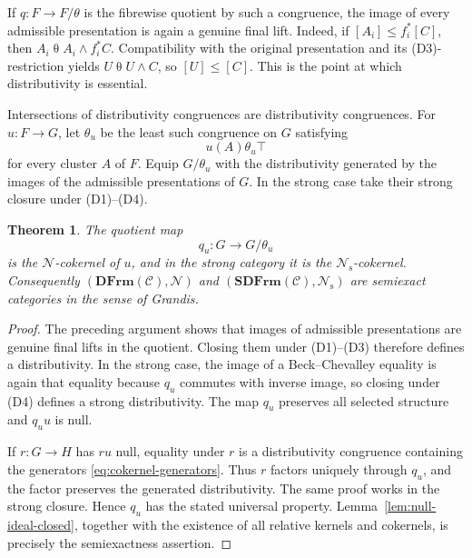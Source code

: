 \documentclass[12pt,oneside,reqno]{amsart}
\newtheorem{theorem}{Theorem}[section]
\theoremstyle{definition}
\theoremstyle{remark}
\newcommand{\C}{\mathcal C}
\newcommand{\DFrm}{\mathbf{DFrm}}
\newcommand{\SDFrm}{\mathbf{SDFrm}}
\newcommand{\Null}{\mathcal N}
\begin{document}
If \(q:F\to F/\theta\) is the fibrewise quotient by such a congruence,
the image of every admissible presentation is again a genuine final
lift.  Indeed, if \([A_i]\leqslant f_i^*[C]\), then
\(A_i\mathrel\theta A_i\wedge f_i^*C\).  Compatibility with the original
presentation and its (D3)-restriction yields
\(U\mathrel\theta U\wedge C\), so \([U]\leqslant[C]\).  This is the
point at which distributivity is essential.

Intersections of distributivity congruences are distributivity
congruences.  For \(u:F\to G\), let \(\theta_u\) be the least such
congruence on \(G\) satisfying
\begin{equation}\label{eq:cokernel-generators}
                         u(A)\mathrel{\theta_u}\top
\end{equation}
for every cluster \(A\) of \(F\).  Equip \(G/\theta_u\) with the
distributivity generated by the images of the admissible presentations
of \(G\).  In the strong case take their strong closure under
(D1)--(D4).

\begin{theorem}\label{thm:cokernels}
The quotient map
\[
                 q_u:G\longrightarrow G/\theta_u
\]
is the \(\Null\)-cokernel of \(u\), and in the strong category it is the
\(\Null_{\mathrm s}\)-cokernel.  Consequently
\((\DFrm(\C),\Null)\) and \((\SDFrm(\C),\Null_{\mathrm s})\) are
semiexact categories in the sense of Grandis.
\end{theorem}

\begin{proof}
The preceding argument shows that images of admissible presentations
are genuine final lifts in the quotient.  Closing them under (D1)--(D3)
therefore defines a distributivity.  In the strong case, the image of a
Beck--Chevalley equality is again that equality because \(q_u\) commutes
with inverse image, so closing under (D4) defines a strong
distributivity.  The map \(q_u\) preserves all selected structure and
\(q_uu\) is null.

If \(r:G\to H\) has \(ru\) null, equality under \(r\) is a
distributivity congruence containing the generators
\eqref{eq:cokernel-generators}.  Thus \(r\) factors uniquely through
\(q_u\), and the factor preserves the generated distributivity.  The
same proof works in the strong closure.  Hence \(q_u\) has the stated
universal property.  Lemma~\ref{lem:null-ideal-closed}, together with
the existence of all relative kernels and cokernels, is precisely the
semiexactness assertion.
\end{proof}
\end{document}
